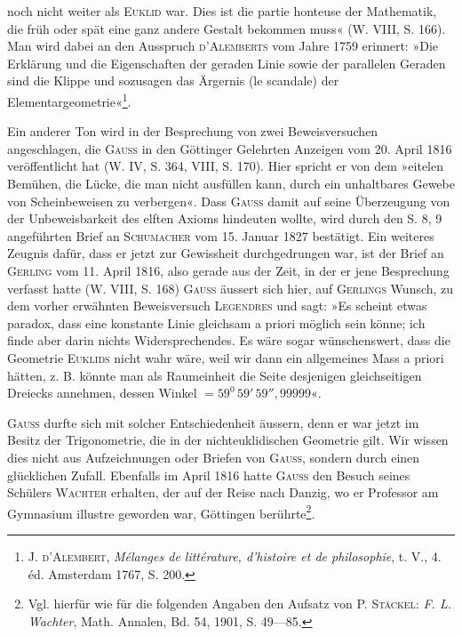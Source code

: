 noch nicht weiter als \textsc{Euklid} war. Dies ist die partie honteuse der Mathematik,
die früh oder spät eine ganz andere Gestalt bekommen muss« (W. VIII,
S. 166). Man wird dabei an den Ausspruch \textsc{d’Alemberts} vom Jahre 1759
erinnert: »Die Erklärung und die Eigenschaften der geraden Linie sowie der
parallelen Geraden sind die Klippe und sozusagen das Ärgernis (le scandale)
der Elementargeometrie«\footnote{J. \textsc{d’Alembert}, \textit{Mélanges de littérature, d’histoire et de philosophie}, t. V., 4. éd. Amsterdam 1767, S. 200.}.
\par
Ein anderer Ton wird in der Besprechung von zwei Beweisversuchen
angeschlagen, die \textsc{Gauss} in den Göttinger Gelehrten Anzeigen vom 20. April
1816 veröffentlicht hat (W. IV, S. 364, VIII, S. 170). Hier spricht er von
dem »eitelen Bemühen, die Lücke, die man nicht ausfüllen kann, durch ein
unhaltbares Gewebe von Scheinbeweisen zu verbergen«. Dass \textsc{Gauss} damit
auf seine Überzeugung von der Unbeweisbarkeit des elften Axioms hindeuten
wollte, wird durch den S. 8, 9 angeführten Brief an \textsc{Schumacher} vom 15. Januar
1827 bestätigt. Ein weiteres Zeugnis dafür, dass er jetzt zur Gewissheit durchgedrungen
war, ist der Brief an \textsc{Gerling} vom 11. April 1816, also gerade aus
der Zeit, in der er jene Besprechung verfasst hatte (W. VIII, S. 168) \textsc{Gauss}
äussert sich hier, auf \textsc{Gerlings} Wunsch, zu dem vorher erwähnten Beweisversuch
\textsc{Legendres} und sagt: »Es scheint etwas paradox, dass eine konstante
Linie gleichsam a priori möglich sein könne; ich finde aber darin nichts
Widersprechendes. Es wäre sogar wünschenswert, dass die Geometrie \textsc{Euklids}
\clearpage{}\setcounter{footnote}{0}
\noindent nicht wahr wäre, weil wir dann ein allgemeines Mass a priori hätten, z. B.
könnte man als Raumeinheit die Seite desjenigen gleichseitigen Dreiecks
annehmen, dessen Winkel \(=59^0\,59'\,59''{,}99999\)«.
\par
\textsc{Gauss} durfte sich mit solcher Entschiedenheit äussern, denn er war jetzt
im Besitz der Trigonometrie, die in der nichteuklidischen Geometrie gilt.
Wir wissen dies nicht aus Aufzeichnungen oder Briefen von \textsc{Gauss}, sondern
durch einen glücklichen Zufall. Ebenfalls im April 1816 hatte \textsc{Gauss} den
Besuch seines Schülers \textsc{Wachter} erhalten, der auf der Reise nach Danzig,
wo er Professor am Gymnasium illustre geworden war, Göttingen berührte\footnote{Vgl. hierfür wie für die folgenden Angaben den Aufsatz von P. \textsc{Stäckel}: \textit{F. L. Wachter}, Math. Annalen, Bd. 54, 1901, S. 49—85.}.
